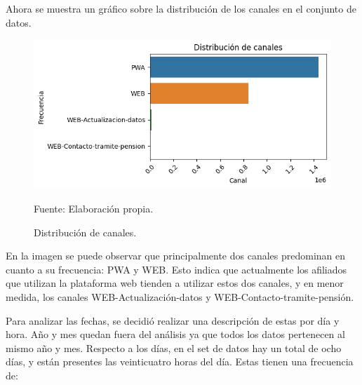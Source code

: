 Ahora se muestra un gráfico sobre la distribución de los canales en el conjunto de datos.

\begin{figure}[H]
    \begin{minipage}[t]{0.9\textwidth}
        \caption{Distribución de canales.}
        \label{descripcion_dataframe}        
    \end{minipage}

    \vspace{10pt}

    \begin{minipage}[b]{0.85\textwidth}
        \centering
        \includegraphics[width=\textwidth]{img/visualizacion-canales.png}        
    \end{minipage}

    \begin{minipage}[t]{0.9\textwidth}
        Fuente: Elaboración propia.
    \end{minipage}
\end{figure}

En la imagen se puede observar que principalmente dos canales predominan en cuanto a su frecuencia: PWA y WEB. Esto indica que actualmente los afiliados que utilizan la plataforma web tienden a utilizar estos dos canales, y en menor medida, los canales WEB-Actualización-datos y WEB-Contacto-tramite-pensión.

Para analizar las fechas, se decidió realizar una descripción de estas por día y hora. Año y mes quedan fuera del análisis ya que todos los datos pertenecen al mismo año y mes. Respecto a los días, en el set de datos hay un total de ocho días, y están presentes las veinticuatro horas del día. Estas tienen una frecuencia de:

